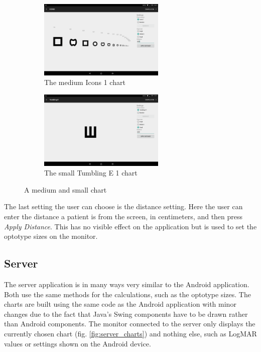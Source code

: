 \documentclass[12pt,a4paper,notitlepage]{report}
\begin{document}
\begin{figure}[ht!]
\centering
\begin{subfigure}{.5\textwidth}
  \centering
  \includegraphics[width=60mm]{images/appgui/icons_medium.png}
  \caption{The medium Icons 1 chart}
  \label{fig:icons_medium}
\end{subfigure}%
\begin{subfigure}{.5\textwidth}
  \centering
  \includegraphics[width=60mm]{images/appgui/tumbling_e_small.png}
  \caption{The small Tumbling E 1 chart}
  \label{fig:tumbling_e_small}
\end{subfigure}
\caption{A medium and small chart}
\label{fig:chart_medium_small}
\end{figure}

The last setting the user can choose is the distance setting. Here the user can enter the distance a patient is from the screen, in centimeters, and then press \textit{Apply Distance}. This has no visible effect on the application but is used to set the optotype sizes on the monitor.

\subsection{Server}
The server application is in many ways very similar to the Android application. Both use the same methods for the calculations, such as the optotype sizes. The charts are built using the same code as the Android application with minor changes due to the fact that Java's Swing components have to be drawn rather than Android components. The monitor connected to the server only displays the currently chosen chart (fig. \ref{fig:server_charts}) and nothing else, such as LogMAR values or settings shown on the Android device.
\end{document}
